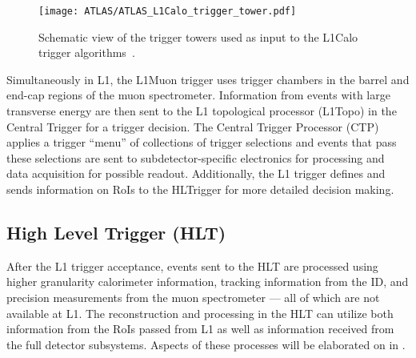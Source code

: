 \begin{figure}[htbp]
 \centering
 \texttt{[image: ATLAS/ATLAS\_L1Calo\_trigger\_tower.pdf]}
 \caption[Schematic view of the trigger towers used as input to the L1Calo trigger algorithms.]{%
  Schematic view of the trigger towers used as input to the L1Calo trigger algorithms~\cite{TRIG-2016-01}.}\label{fig:ATLAS_L1Calo_trigger_tower}
\end{figure}

Simultaneously in L1, the L1Muon trigger uses trigger chambers in the barrel and end-cap regions of the muon spectrometer.
Information from events with large transverse energy are then sent to the L1 topological processor (L1Topo) in the Central Trigger for a trigger decision.
The Central Trigger Processor (CTP) applies a trigger ``menu'' of collections of trigger selections and events that pass these selections are sent to subdetector-specific electronics for processing and data acquisition for possible readout.
Additionally, the L1 trigger defines and sends information on RoIs to the HLTrigger for more detailed decision making.

\subsection{High Level Trigger (HLT)}\label{sec:ATLAS_HLT}

After the L1 trigger acceptance, events sent to the HLT are processed using higher granularity calorimeter information, tracking information from the ID, and precision measurements from the muon spectrometer --- all of which are not available at L1.
The reconstruction and processing in the HLT can utilize both information from the RoIs passed from L1 as well as information received from the full detector subsystems.
Aspects of these processes will be elaborated on in .
